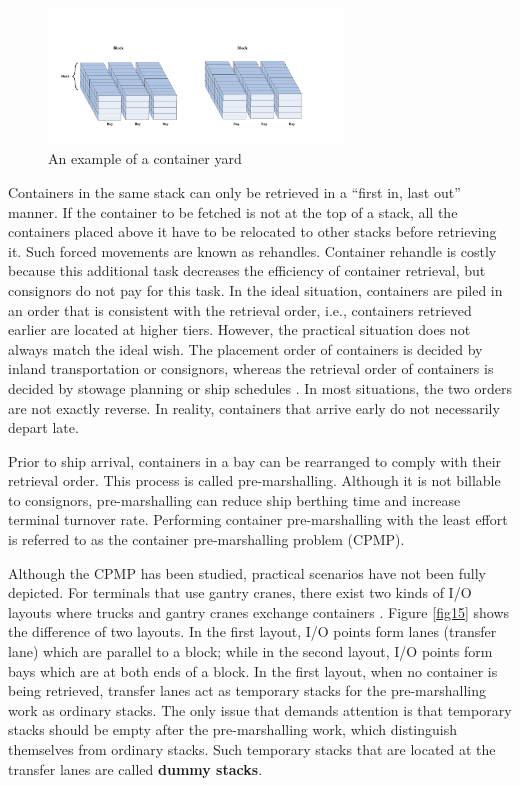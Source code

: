 \documentclass[review,3p,times,authoryear,12pt]{elsarticle}
\begin{document}
\begin{figure}[!htb]
\centering
\includegraphics[width=0.7\textwidth]{fig1.pdf}
\caption{An example of a container yard}
\label{fig:1}
\end{figure}

Containers in the same stack can only be retrieved in a ``first in, last out'' manner.
If the container to be fetched is not at the top of a stack, all the containers placed above it have to be relocated to other stacks before retrieving it.
Such forced movements are known as rehandles.
Container rehandle is costly because this additional task decreases the efficiency of container retrieval, but consignors do not pay for this task.
In the ideal situation, containers are piled in an order that is consistent with the retrieval order, i.e., containers retrieved earlier are located at higher tiers.
However, the practical situation does not always match the ideal wish.
The placement order of containers is decided by inland transportation or consignors, whereas the retrieval order of containers is decided by stowage planning or ship schedules \citep{Kanet1986}. 
In most situations, the two orders are not exactly reverse. In reality, containers that arrive early do not necessarily depart late.

Prior to ship arrival, containers in a bay can be rearranged to comply with their retrieval order.
This process is called pre-marshalling.
Although it is not billable to consignors, pre-marshalling can reduce ship berthing time and increase terminal turnover rate.
Performing container pre-marshalling with the least effort is referred to as the container pre-marshalling problem (CPMP).

Although the CPMP has been studied, practical scenarios have not been fully depicted.
For terminals that use gantry cranes, there exist two kinds of I/O layouts where trucks and gantry cranes exchange containers \citep{Carlo2014}.
Figure \ref{fig15} shows the difference of two layouts.
In the first layout, I/O points form lanes (transfer lane) which are parallel to a block; while in the second layout, I/O points form bays which are at both ends of a block.
In the first layout, when no container is being retrieved, transfer lanes act as temporary stacks for the pre-marshalling work as ordinary stacks.
The only issue that demands attention is that temporary stacks should be empty after the pre-marshalling work, which distinguish themselves from ordinary stacks.
Such temporary stacks that are located at the transfer lanes are called \textbf{dummy stacks}.
\end{document}
